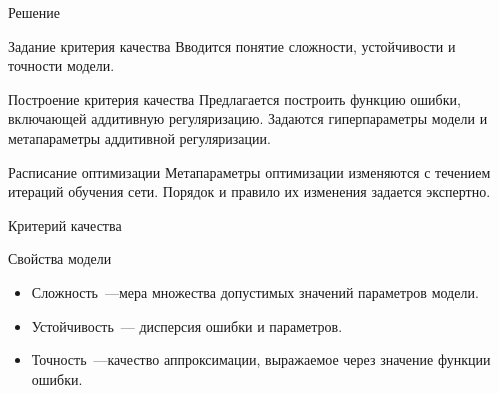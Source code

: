 \documentclass[9pt,pdf,hyperref={unicode}]{beamer}
\begin{document}
\begin{frame}{Решение}
\begin{block}{Задание критерия качества}
    Вводится понятие сложности, устойчивости и точности модели.
\end{block}
\begin{block}{Построение критерия качества}
    Предлагается построить функцию ошибки, включающей аддитивную регуляризацию. Задаются гиперпараметры модели и метапараметры аддитивной регуляризации.
\end{block}
\begin{block}{Расписание оптимизации}
    Метапараметры оптимизации изменяются с течением итераций обучения сети. Порядок и правило их изменения задается экспертно.
\end{block}


\end{frame}
\begin{frame}{Критерий качества}
\begin{block}{Свойства модели}
    \begin{itemize}
    \item
    Сложность~---мера множества допустимых значений параметров модели.
    \item
    Устойчивость~--- дисперсия ошибки и параметров.
    \item 
    Точность~---качество аппроксимации, выражаемое через значение функции ошибки.
\end{itemize}
\end{block}


\end{frame}
\end{document}
